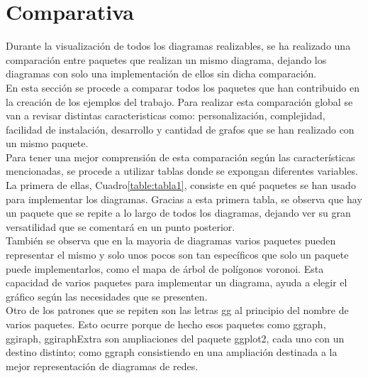 \documentclass{article}\usepackage[]{graphicx}\usepackage[]{color}
\begin{document}
\section{Comparativa}
Durante la visualizaci\'on de todos los diagramas realizables, se ha realizado una comparaci\'on entre paquetes que realizan un mismo diagrama, dejando los diagramas con solo una implementaci\'on de ellos sin dicha comparaci\'on.~\\
En esta secci\'on se procede a comparar todos los paquetes que han contribuido en la creaci\'on de los ejemplos del trabajo. Para realizar esta comparaci\'on global se van a revisar distintas caracteristicas como: personalizaci\'on, complejidad, facilidad de instalaci\'on, desarrollo y cantidad de grafos que se han realizado con un mismo paquete.~\\
Para tener una mejor comprensi\'on de esta comparaci\'on seg\'un las caracter\'isticas mencionadas, se procede a utilizar tablas donde se expongan diferentes variables. La primera de ellas, Cuadro\ref{table:tabla1}, consiste en qu\'e paquetes se han usado para implementar los diagramas. Gracias a esta primera tabla, se observa que hay un paquete que se repite a lo largo de todos los diagramas, dejando ver su gran versatilidad que se comentar\'a en un punto posterior.~\\
Tambi\'en se observa que en la mayoria de diagramas varios paquetes pueden representar el mismo y solo unos pocos son tan espec\'ificos que solo un paquete puede implementarlos, como el mapa de \'arbol de pol\'igonos voronoi. Esta capacidad de varios paquetes para implementar un diagrama, ayuda a elegir el gr\'afico seg\'un las necesidades que se presenten.~\\
Otro de los patrones que se repiten son las letras gg al principio del nombre de varios paquetes. Esto ocurre porque de hecho esos paquetes como ggraph, ggiraph, ggiraphExtra son ampliaciones del paquete ggplot2, cada uno con un destino distinto; como ggraph consistiendo en una ampliaci\'on destinada a la mejor representaci\'on de diagramas de redes.
\end{document}
